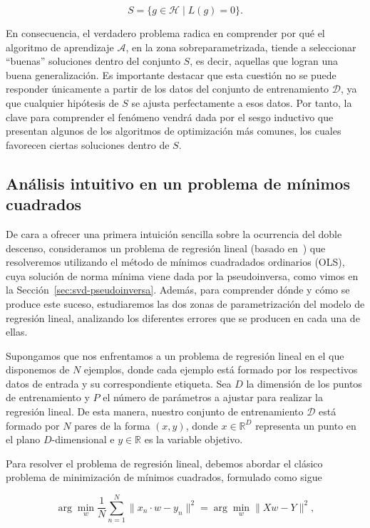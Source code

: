 \[
    S = \{ g \in \mathcal{H} \mid L(g) = 0 \}.
\]

En consecuencia, el verdadero problema radica en comprender por qué el algoritmo de aprendizaje $\mathcal{A}$, en la zona sobreparametrizada, tiende a seleccionar ``buenas'' soluciones dentro del conjunto $S$, es decir, aquellas que logran una buena generalización. Es importante destacar que esta cuestión no se puede responder únicamente a partir de los datos del conjunto de entrenamiento $\mathcal{D}$, ya que cualquier hipótesis de $S$ se ajusta perfectamente a esos datos. Por tanto, la clave para comprender el fenómeno vendrá dada por el sesgo inductivo que presentan algunos de los algoritmos de optimización más comunes, los cuales favorecen ciertas soluciones dentro de $S$.

\subsection{Análisis intuitivo en un problema de mínimos cuadrados}\label{subsec:analisis-intuitivo-minimos-cuadrados}

De cara a ofrecer una primera intuición sencilla sobre la ocurrencia del doble descenso, consideramos un problema de regresión lineal (basado en~\cite{Schaeffer2023}) que resolveremos utilizando el método de mínimos cuadradados ordinarios (OLS), cuya solución de norma mínima viene dada por la pseudoinversa, como vimos en la Sección~\ref{sec:svd-pseudoinversa}. Además, para comprender dónde y cómo se produce este suceso, estudiaremos las dos zonas de parametrización del modelo de regresión lineal, analizando los diferentes errores que se producen en cada una de ellas.

Supongamos que nos enfrentamos a un problema de regresión lineal en el que disponemos de $N$ ejemplos, donde cada ejemplo está formado por los respectivos datos de entrada y su correspondiente etiqueta. Sea $D$ la dimensión de los puntos de entrenamiento y $P$ el número de parámetros a ajustar para realizar la regresión lineal. De esta manera, nuestro conjunto de entrenamiento $\mathcal{D}$ está formado por $N$ pares de la forma $(x,y)$, donde $x \in \mathbb{R}^{D}$ representa un punto en el plano $D$-dimensional e $y \in \mathbb{R}$ es la variable objetivo.

Para resolver el problema de regresión lineal, debemos abordar el clásico problema de minimización de mínimos cuadrados, formulado como sigue

\begin{equation}\label{eq:minimos-cuadrados1}
    \arg\min_{w} \frac{1}{N}\sum_{n=1}^{N}\| x_n \cdot w - y_n \|^{2} = \arg\min_{w}\| Xw - Y \|^{2},
\end{equation}

